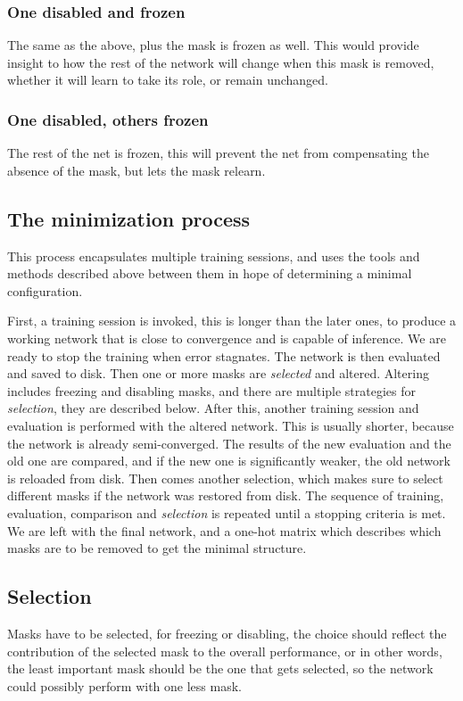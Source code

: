 \documentclass[12pt]{report}
\begin{document}
\subsubsection{One disabled and frozen}The same as the above, plus the mask is frozen as well. This would provide insight to how the rest of the network will change when this mask is removed, whether it will learn to take its role, or remain unchanged.
\subsubsection{One disabled, others frozen}The rest of the net is frozen, this will prevent the net from compensating the absence of the mask, but lets the mask relearn.
\subsection{The minimization process}
This process encapsulates multiple training sessions, and uses the tools and methods described above between them in hope of determining a minimal configuration.\par

First, a training session is invoked, this is longer than the later ones, to produce a working network that is close to convergence and is capable of inference. We are ready to stop the training when error stagnates. The network is then evaluated and saved to disk. Then one or more masks are \textit{selected} and altered. Altering includes freezing and disabling masks, and there are multiple strategies for \textit{selection}, they are described below. After this, another training session and evaluation is performed with the altered network. This is usually shorter, because the network is already semi-converged. The results of the new evaluation and the old one are compared, and if the new one is significantly weaker, the old network is reloaded from disk. Then comes another selection, which makes sure to select different masks if the network was restored from disk. The sequence of training, evaluation, comparison and \textit{selection} is repeated until a stopping criteria is met. We are left with the final network, and a one-hot matrix which describes which masks are to be removed to get the minimal structure.
\subsection{Selection}
Masks have to be selected, for freezing or disabling, the choice should reflect the contribution of the selected mask to the overall performance, or in other words, the least important mask should be the one that gets selected, so the network could possibly perform with one less mask.
\end{document}
